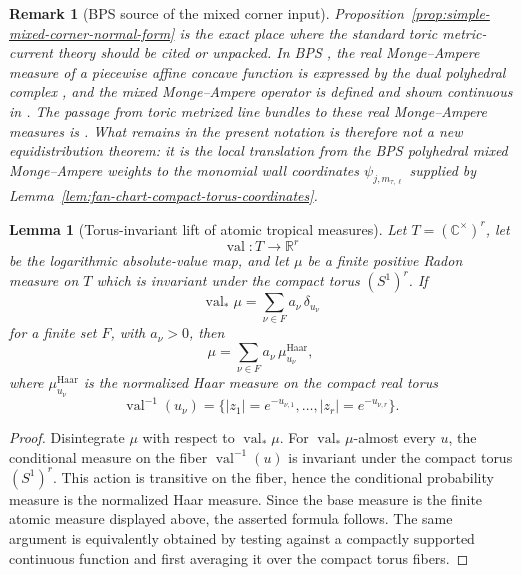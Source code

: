 \documentclass[10pt,a4paper]{amsart}
\theoremstyle{plain}
\newtheorem{lemma}[theorem]{Lemma}
\newtheorem{remark}[theorem]{Remark}
\theoremstyle{plain}
\numberwithin{equation}{section}
\begin{document}
\begin{remark}[BPS source of the mixed corner input]
	\label{rem:bps-mixed-corner-source}
	Proposition~\ref{prop:simple-mixed-corner-normal-form} is the exact place where the
	standard toric metric-current theory should be cited or unpacked.  In BPS
	\cite[\S2.7]{BPS14}, the real Monge--Ampere measure of a piecewise affine
	concave function is expressed by the dual polyhedral complex
	\cite[Proposition~2.7.4]{BPS14}, and the mixed Monge--Ampere operator is
	defined and shown continuous in
	\cite[Definition~2.7.12 and Proposition~2.7.13]{BPS14}.  The passage from
	toric metrized line bundles to these real Monge--Ampere measures is
	\cite[Theorem~4.8.11 and Corollary~4.8.12]{BPS14}.  What remains in the
	present notation is therefore not a new equidistribution theorem: it is the
	local translation from the BPS polyhedral mixed Monge--Ampere weights to the
	monomial wall coordinates \(\psi_{j,m_{\tau,\ell}}\) supplied by
	Lemma~\ref{lem:fan-chart-compact-torus-coordinates}.
\end{remark}

\begin{lemma}[Torus-invariant lift of atomic tropical measures]
	\label{lem:torus-invariant-atomic-lift}
	Let \(T=(\mathbb C^\times)^r\), let
	\[
	\operatorname{val}:T\longrightarrow \mathbb R^r
	\]
	be the logarithmic absolute-value map, and let \(\mu\) be a finite positive
	Radon measure on \(T\) which is invariant under the compact torus
	\((S^1)^r\).  If
	\[
	\operatorname{val}_*\mu=\sum_{\nu\in F} a_\nu\,\delta_{u_\nu}
	\]
	for a finite set \(F\), with \(a_\nu>0\), then
	\[
	\mu=\sum_{\nu\in F} a_\nu\,\mu^{\operatorname{Haar}}_{u_\nu},
	\]
	where \(\mu^{\operatorname{Haar}}_{u_\nu}\) is the normalized Haar measure on
	the compact real torus
	\[
	\operatorname{val}^{-1}(u_\nu)
	=\{|z_1|=e^{-u_{\nu,1}},\ldots,|z_r|=e^{-u_{\nu,r}}\}.
	\]
\end{lemma}

\begin{proof}
	Disintegrate \(\mu\) with respect to \(\operatorname{val}_*\mu\).  For
	\(\operatorname{val}_*\mu\)-almost every \(u\), the conditional measure on the
	fiber \(\operatorname{val}^{-1}(u)\) is invariant under the compact torus
	\((S^1)^r\).  This action is transitive on the fiber, hence the conditional
	probability measure is the normalized Haar measure.  Since the base measure is
	the finite atomic measure displayed above, the asserted formula follows.  The
	same argument is equivalently obtained by testing against a compactly
	supported continuous function and first averaging it over the compact torus
	fibers.
\end{proof}
\end{document}
